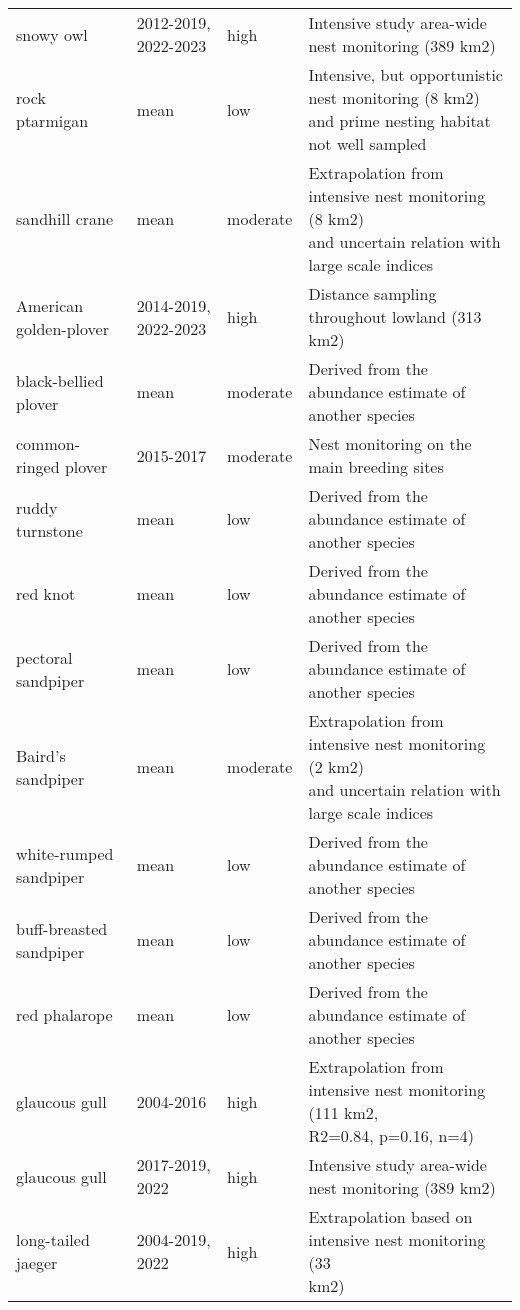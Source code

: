 \begin{longtable}{llll}
  snowy owl & 2012-2019, 2022-2023 & high & Intensive study area-wide nest monitoring (389 km2) \\ 
  rock ptarmigan & mean & low & \makecell[tl]{Intensive, but opportunistic nest monitoring (8 km2)\\and prime nesting habitat not well sampled} \\ 
  sandhill crane & mean & moderate & \makecell[tl]{Extrapolation from intensive nest monitoring (8 km2)\\and uncertain relation with large scale indices} \\ 
  American golden-plover & 2014-2019, 2022-2023 & high & Distance sampling throughout lowland (313 km2) \\ 
  black-bellied plover & mean & moderate & Derived from the abundance estimate of another species \\ 
  common-ringed plover & 2015-2017 & moderate & Nest monitoring on the main breeding sites \\ 
  ruddy turnstone & mean & low & Derived from the abundance estimate of another species \\ 
  red knot & mean & low & Derived from the abundance estimate of another species \\ 
  pectoral sandpiper & mean & low & Derived from the abundance estimate of another species \\ 
  Baird's sandpiper & mean & moderate & \makecell[tl]{Extrapolation from intensive nest monitoring (2 km2)\\and uncertain relation with large scale indices} \\ 
  white-rumped sandpiper & mean & low & Derived from the abundance estimate of another species \\ 
  buff-breasted sandpiper & mean & low & Derived from the abundance estimate of another species \\ 
  red phalarope & mean & low & Derived from the abundance estimate of another species \\ 
  glaucous gull & 2004-2016 & high & \makecell[tl]{Extrapolation from intensive nest monitoring (111 km2,\\R2=0.84, p=0.16, n=4)} \\ 
  glaucous gull & 2017-2019, 2022 & high & Intensive study area-wide nest monitoring (389 km2) \\ 
  long-tailed jaeger & 2004-2019, 2022 & high & \makecell[tl]{Extrapolation based on intensive nest monitoring (33\\km2)} \\ 

\end{longtable}

